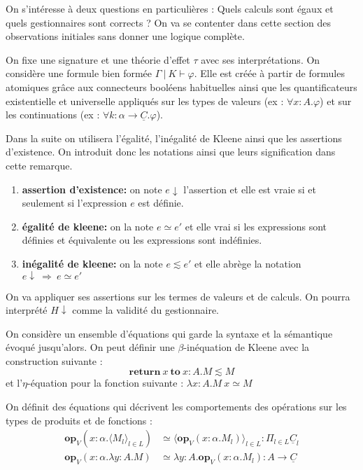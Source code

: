 On s'intéresse à deux questions en particulières : Quels calculs sont égaux et quels gestionnaires sont corrects ? On va se contenter dans cette section des observations initiales sans donner une logique complète.
\smallbreak

On fixe une signature et une théorie d'effet $\tau$ avec ses interprétations. On considère une formule bien formée $\Gamma~|~K \vdash \varphi$. Elle est créée à partir de formules atomiques grâce aux connecteurs booléens habituelles ainsi que les quantificateurs existentielle et universelle appliqués sur les types de valeurs (ex : $\forall x:A.\varphi$) et sur les continuations (ex : $\forall k:\alpha \rightarrow \underline{C}.\varphi$).

\begin{remark}
	Dans la suite on utilisera l'égalité, l'inégalité de Kleene ainsi que les assertions d'existence. On introduit donc les notations ainsi que leurs signification dans cette remarque.
	
	\begin{enumerate}
		\item[] \textbf{assertion d'existence:} on note $e \downarrow$ l'assertion et elle est vraie si et seulement si l'expression $e$ est définie.
		\item[] \textbf{égalité de kleene:} on la note $e \simeq e'$ et elle vrai si les expressions sont définies et équivalente ou les expressions sont indéfinies.
		\item[] \textbf{inégalité de kleene:} on la note $e \lesssim e'$ et elle abrège la notation $e \downarrow~\Rightarrow~e \simeq e'$
	\end{enumerate}
\end{remark}

On va appliquer ses assertions sur les termes de valeurs et de calculs. On pourra interprété $H\downarrow$ comme la validité du gestionnaire. 
\medbreak

\begin{exemple}
	On considère un ensemble d'équations qui garde la syntaxe et la sémantique évoqué jusqu'alors.
	On peut définir une $\beta$-inéquation de Kleene avec la construction suivante : 
	\[\textbf{return}~x~\textbf{to}~x:A. M \lesssim M\]
	et l'$\eta$-équation pour la fonction suivante : 
	$\lambda x:A.M~x \simeq M$
\end{exemple}

On définit des équations qui décrivent les comportements des opérations sur les types de produits et de fonctions : 
\begin{align*}
	\textbf{op}_V(x:\alpha.\langle M_l\rangle_{l \in L}) &\simeq \langle\textbf{op}_V(x:\alpha. M_l)\rangle_{l \in L}:\Pi_{l \in L} \underline{C}_l\\
	\textbf{op}_V(x:\alpha.\lambda y:A.M) &\simeq \lambda y:A.\textbf{op}_V(x:\alpha. M_l):A \rightarrow \underline{C}
\end{align*}



